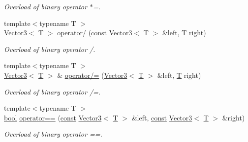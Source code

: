 \begin{DoxyCompactItemize}
\begin{DoxyCompactList}\small\item\em Overload of binary operator $\ast$=. \end{DoxyCompactList}\item 
{\footnotesize template$<$typename T $>$ }\\\hyperlink{classsf_1_1_vector3}{Vector3}$<$ \hyperlink{curses_8priv_8h_a5ef253115820acf7d27f3c5c3b02a0f0}{T} $>$ \hyperlink{classsf_1_1_vector3_ad4ba4a83de236ddeb92a7b759187e90d}{operator/} (\hyperlink{term__entry_8h_a57bd63ce7f9a353488880e3de6692d5a}{const} \hyperlink{classsf_1_1_vector3}{Vector3}$<$ \hyperlink{curses_8priv_8h_a5ef253115820acf7d27f3c5c3b02a0f0}{T} $>$ \&left, \hyperlink{curses_8priv_8h_a5ef253115820acf7d27f3c5c3b02a0f0}{T} right)
\begin{DoxyCompactList}\small\item\em Overload of binary operator /. \end{DoxyCompactList}\item 
{\footnotesize template$<$typename T $>$ }\\\hyperlink{classsf_1_1_vector3}{Vector3}$<$ \hyperlink{curses_8priv_8h_a5ef253115820acf7d27f3c5c3b02a0f0}{T} $>$ \& \hyperlink{classsf_1_1_vector3_a8995a700f9dffccc6dddb3696ae17b64}{operator/=} (\hyperlink{classsf_1_1_vector3}{Vector3}$<$ \hyperlink{curses_8priv_8h_a5ef253115820acf7d27f3c5c3b02a0f0}{T} $>$ \&left, \hyperlink{curses_8priv_8h_a5ef253115820acf7d27f3c5c3b02a0f0}{T} right)
\begin{DoxyCompactList}\small\item\em Overload of binary operator /=. \end{DoxyCompactList}\item 
{\footnotesize template$<$typename T $>$ }\\\hyperlink{term__entry_8h_a002004ba5d663f149f6c38064926abac}{bool} \hyperlink{classsf_1_1_vector3_a388d72db973306a35ba467016b3dee30}{operator==} (\hyperlink{term__entry_8h_a57bd63ce7f9a353488880e3de6692d5a}{const} \hyperlink{classsf_1_1_vector3}{Vector3}$<$ \hyperlink{curses_8priv_8h_a5ef253115820acf7d27f3c5c3b02a0f0}{T} $>$ \&left, \hyperlink{term__entry_8h_a57bd63ce7f9a353488880e3de6692d5a}{const} \hyperlink{classsf_1_1_vector3}{Vector3}$<$ \hyperlink{curses_8priv_8h_a5ef253115820acf7d27f3c5c3b02a0f0}{T} $>$ \&right)
\begin{DoxyCompactList}\small\item\em Overload of binary operator ==. \end{DoxyCompactList}\item 

\end{DoxyCompactItemize}

